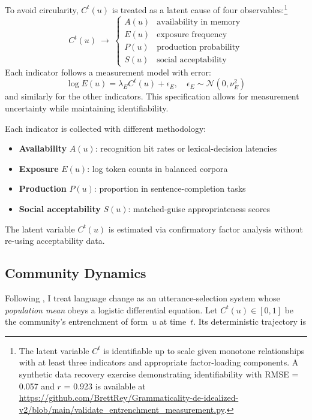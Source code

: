 \documentclass[12pt]{article}
\begin{document}
To avoid circularity, $C^{t}(u)$ is treated as a latent cause of four observables:\footnote{The latent variable $C^{t}$ is identifiable up to scale given monotone relationships with at least three indicators and appropriate factor-loading components. A synthetic data recovery exercise demonstrating identifiability with RMSE = 0.057 and $r$ = 0.923 is available at \url{https://github.com/BrettRey/Grammaticality-de-idealized-v2/blob/main/validate_entrenchment_measurement.py}.}
\begin{equation}
C^{t}(u)\ \longrightarrow\ 
\begin{cases}
A(u) & \text{availability in memory}\\
E(u) & \text{exposure frequency}\\
P(u) & \text{production probability}\\
S(u) & \text{social acceptability}
\end{cases}
\end{equation}
Each indicator follows a measurement model with error:
\begin{equation}
\log E(u) = \lambda_E C^{t}(u) + \epsilon_E, \quad \epsilon_E \sim \mathcal{N}(0,\nu_E^{2})
\end{equation}
and similarly for the other indicators. This specification allows for measurement uncertainty while maintaining identifiability.

Each indicator is collected with different methodology:
\begin{itemize}
  \item \textbf{Availability} $A(u)$: recognition hit rates or lexical-decision latencies
  \item \textbf{Exposure} $E(u)$: log token counts in balanced corpora
  \item \textbf{Production} $P(u)$: proportion in sentence-completion tasks
  \item \textbf{Social acceptability} $S(u)$: matched-guise appropriateness scores
\end{itemize}

The latent variable $C^{t}(u)$ is estimated via confirmatory factor analysis without re-using acceptability data.

\subsection{Community Dynamics}
\label{sec:community-dynamics}

Following \textcite{BlytheCroft2012}, I treat language change as an utterance-selection system whose \emph{population mean} obeys a logistic differential equation.  Let $C^{t}(u)\!\in[0,1]$ be the community's entrenchment of form~$u$ at time~$t$.  Its deterministic trajectory is
\end{document}
